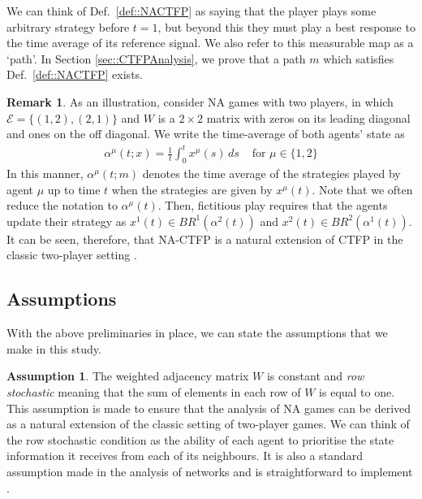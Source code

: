 \documentclass{article}
\theoremstyle{definition}
\newtheorem{assumption}{Assumption}
\newtheorem*{remark}{Remark}
\newcommand{\edgeset}{\mathcal{E}}
\newcommand{\weightset}{W}
\newcommand{\xmu}{x^{\mu}}
\begin{document}
  We can think of Def.~\ref{def::NACTFP} as saying that the player plays some arbitrary strategy before
  $t = 1$, but beyond this they must play a best response to the time average of its reference
  signal. We also refer to this measurable map as a `path'. In Section \ref{sec::CTFPAnalysis}, we prove that a path $m$ which satisfies Def.~\ref{def::NACTFP} exists.
  
  \begin{remark}
    As an illustration, consider NA games with two players, in which $\edgeset = \{(1, 2),
    (2, 1)\}$ and $\weightset$ is a $2\times 2$ matrix with zeros on its leading diagonal and ones on
    the off diagonal. We write the time-average of both agents' state as
    \begin{align*}
      \alpha^\mu(t; x) = \frac{1}{t} \int_0^t \xmu(s) \, ds & \text{ for $\mu \in \{1, 2\}$}
    \end{align*}
    In this manner, $\alpha^\mu(t; m)$ denotes the time average of the strategies played by
    agent $\mu$ up to time $t$ when the strategies are given by $\xmu(t)$. Note that we often reduce the notation to $\alpha^\mu(t)$. Then, fictitious play requires that the agents update their
    strategy as $x^1(t) \in BR^1(\alpha^2(t))$ and $x^2(t) \in BR^2(\alpha^1(t))$. It can be
    seen, therefore, that NA-CTFP is a natural extension of CTFP in the classic
    two-player setting \cite{Hofbauer2006}.
  \end{remark}

\subsection{Assumptions}

  With the above preliminaries in place, we can state the assumptions that we make in this study.

  \begin{assumption}\label{ass::rowstochastic}
    The weighted adjacency matrix $\weightset$ is constant and
    \emph{row stochastic} meaning that the sum of elements in each row of
    $\weightset$ is equal to one. This assumption is made to ensure
    that the analysis of NA games can be derived as a natural
    extension of the classic setting of two-player games. We can
    think of the row stochastic condition as the ability of each agent
    to prioritise the state information it receives from each of its
    neighbours. It is also a standard assumption made in the analysis
    of networks and is straightforward to implement \cite{Mai2019}.
  \end{assumption}
\end{document}
